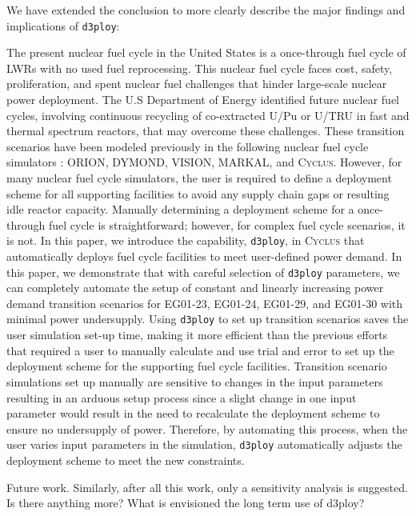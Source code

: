 \documentclass[answers,11pt]{exam}
\newcommand{\Cyclus}{\textsc{Cyclus}\xspace}%
\newcommand{\deploy}{\texttt{d3ploy}\xspace}%
\begin{document}
\begin{questions}
\begin{solution}
We have extended the conclusion to more clearly describe the major findings and implications of 
\deploy: 

The present nuclear fuel cycle in the United States is a once-through 
fuel cycle of LWRs with no used fuel reprocessing. 
This nuclear fuel cycle faces cost, safety, proliferation, and spent 
nuclear fuel challenges that hinder large-scale nuclear power deployment. 
The U.S Department of Energy identified future 
nuclear fuel cycles, involving continuous recycling of co-extracted U/Pu or 
U/TRU in fast and thermal spectrum reactors, that may overcome these challenges.
These transition scenarios have been modeled previously in the following 
nuclear fuel cycle simulators \cite{feng_standardized_2016,bae_standardized_2019}: 
ORION, DYMOND, VISION, MARKAL, and \Cyclus. 
However, for many nuclear fuel cycle simulators, the user is required to 
define a deployment scheme for all supporting facilities to avoid any 
supply chain gaps or resulting idle reactor capacity. 
Manually determining a deployment scheme for a once-through 
fuel cycle is straightforward; however, for complex fuel cycle 
scenarios, it is not. 
In this paper, we introduce the capability, \deploy, in \Cyclus 
that automatically deploys 
fuel cycle facilities to meet user-defined power demand.     
In this paper, we demonstrate that with careful selection of 
\deploy parameters, we can 
completely automate the setup of constant and 
linearly increasing power demand transition scenarios
for EG01-23, EG01-24, EG01-29, and EG01-30 with minimal 
power undersupply. 
Using \deploy to set up transition scenarios 
saves the user simulation set-up time, making it more efficient 
than the previous efforts that
required a user to manually calculate and use trial and error 
to set up the deployment scheme for the supporting fuel cycle 
facilities. 
Transition scenario simulations set up manually are sensitive 
to changes in the input parameters resulting in an 
arduous setup process since a slight change in one 
input parameter would result in the need to recalculate 
the deployment scheme to ensure no undersupply 
of power.   
Therefore, by automating this process, when the user varies input parameters 
in the simulation, \deploy automatically adjusts the
deployment scheme to meet the new constraints. 
\end{solution}

\question Future work. Similarly, after all this work, only a sensitivity analysis is suggested. Is there anything
more? What is envisioned the long term use of d3ploy?


\end{questions}
\end{document}
